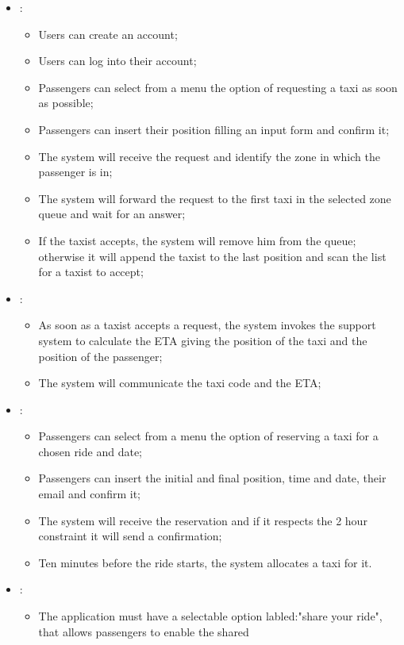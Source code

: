 \begin {itemize}
\item [G1]:
	\begin{itemize}
	\item Users can create an account;
	\item Users can log into their account;
	\item Passengers can select from a menu the option of requesting a taxi as soon as possible; 
	\item Passengers can insert their position filling an input form and confirm it;
	\item The system will receive the request and identify the zone in which the passenger is in;
	\item The system will forward the request to the first taxi in the selected zone queue and wait for an answer;
	\item If the taxist accepts, the system will remove him from the queue; otherwise it will append the taxist to the last position and
scan the list for a taxist to accept;
	\end{itemize}
\item [G2]:
	\begin{itemize}
	\item As soon as a taxist accepts a request, the system invokes the support system to calculate the ETA giving the position of the taxi and the position of the passenger;
	\item The system will communicate the taxi code and the ETA;
	\end{itemize}
\item [G3]:
	\begin{itemize}
	\item Passengers can select from a menu the option of reserving a taxi for a chosen ride and date; 
	\item Passengers can insert the initial and final position, time and date, their email and confirm it;
	\item The system will receive the reservation and if it respects the 2 hour constraint it will send a confirmation;
	\item Ten minutes before the ride starts, the system allocates a taxi for it.
	\end{itemize}
\item [G4]:
	\begin{itemize}
	\item The application must have a selectable option labled:"share your ride", that allows passengers to enable the shared 

\end{itemize}
\end{itemize}
